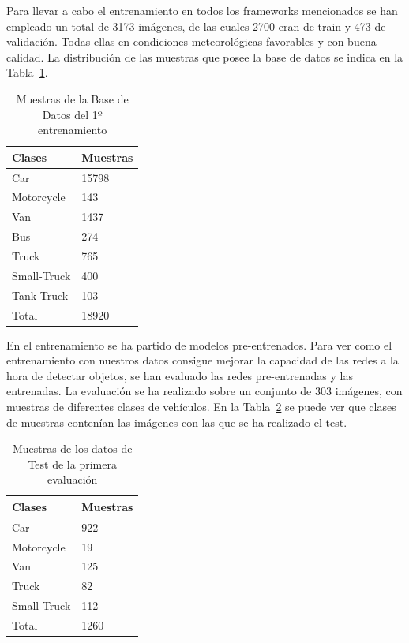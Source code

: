 Para llevar a cabo el entrenamiento en todos los frameworks mencionados se han empleado un total de 3173 imágenes, de las cuales 2700 eran de train y 473 de validación. Todas ellas en condiciones meteorológicas favorables y con buena calidad. La distribución de las muestras que posee la base de datos se indica en la Tabla~\ref{tabla_database}.

\begin{table}[htbp]
\begin{center}
\begin{tabular}{|l|l|}
\hline
Clases & Muestras \\
\hline \hline
Car & 15798 \\ \hline
Motorcycle & 143 \\ \hline
Van & 1437 \\ \hline
Bus & 274 \\ \hline
Truck & 765 \\ \hline
Small-Truck & 400 \\ \hline
Tank-Truck & 103 \\ \hline
Total & 18920 \\ \hline
\end{tabular}
\caption{Muestras de la Base de Datos del 1º entrenamiento}
\label{tabla_database}
\end{center}
\end{table}

En el entrenamiento se ha partido de modelos pre-entrenados. Para ver como el entrenamiento con nuestros datos consigue mejorar la capacidad de las redes a la hora de detectar objetos, se han evaluado las redes pre-entrenadas y las entrenadas. La evaluación se ha realizado sobre un conjunto de 303 imágenes, con muestras de diferentes clases de vehículos. En la Tabla~\ref{tabla_datos_primera_evaluacion} se puede ver que clases de muestras contenían las imágenes con las que se ha realizado el test.

\begin{table}[htbp]
\begin{center}
\begin{tabular}{|l|l|}
\hline
Clases & Muestras \\
\hline \hline
Car & 922 \\ \hline
Motorcycle & 19 \\ \hline
Van & 125 \\ \hline
Truck & 82 \\ \hline
Small-Truck & 112 \\ \hline
Total & 1260 \\ \hline
\end{tabular}
\caption{Muestras de los datos de Test de la primera evaluación}
\label{tabla_datos_primera_evaluacion}
\end{center}
\end{table}

